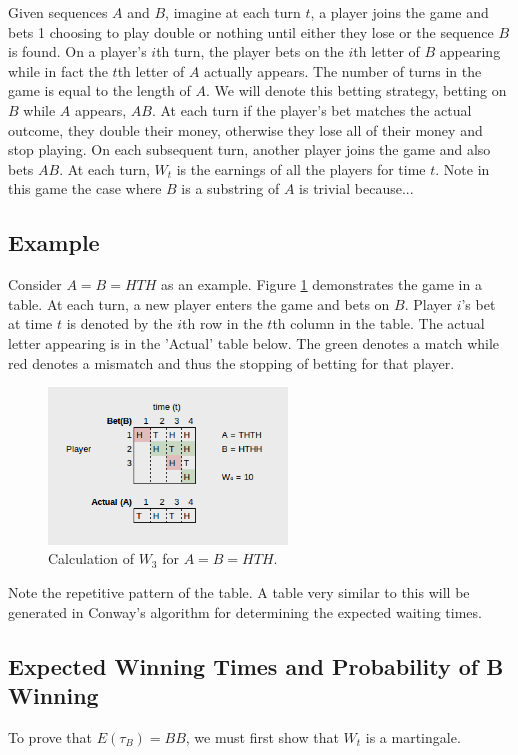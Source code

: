 \documentclass{article}
\numberwithin{mytheorem}{subsection} %
\begin{document}
		    Given sequences $A$ and $B$, imagine at each turn $t$, a player joins the game and bets 1 choosing to play double or nothing until either they lose or the sequence $B$ is found. On a player's $i$th turn, the player bets on the $i$th letter of $B$ appearing while in fact the $t$th letter of $A$ actually appears. The number of turns in the game is equal to the length of $A$. We will denote this betting strategy, betting on $B$ while $A$ appears, $AB$. At each turn if the player's bet matches the actual outcome, they double their money, otherwise they lose all of their money and stop playing. On each subsequent turn, another player joins the game and also bets $AB$. At each turn, $W_t$ is the earnings of all the players for time $t$. Note in this game the case where $B$ is a substring of $A$ is trivial because... \cite{grinstead} 

		\subsection{Example}
			Consider $A = B = HTH$ as an example. Figure \ref{fig} demonstrates the game in a table. At each turn, a new player enters the game and bets on $B$. Player $i$'s bet at time $t$ is denoted by the $i$th row in the $t$th column in the table. The actual letter appearing is in the 'Actual' table below. The green denotes a match while red denotes a mismatch and thus the stopping of betting for that player. 
			\begin{figure}[h]
				\begin{center}
					\includegraphics[width=2.5in]{AB}
				\end{center}
			
				\caption{Calculation of $W_3$ for $A = B = HTH$.}
				\label{fig}
			\end{figure}

			Note the repetitive pattern of the table. A table very similar to this will be generated in Conway's algorithm for determining the expected waiting times. 

		\subsection{Expected Winning Times and Probability of B Winning}
		    To prove that $E(\tau_B) = BB$, we must first show that $W_t$ is a martingale.
\end{document}
